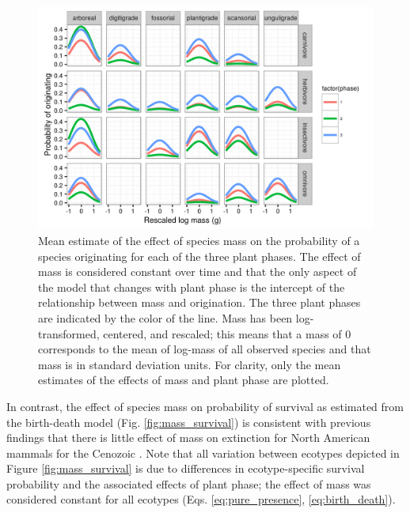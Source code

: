 \begin{figure}[ht]
  \centering
  \includegraphics[width=\textwidth,height=0.4\textheight,keepaspectratio=true]{chapter_coping/figure/mass_on_origin_bd}
  \caption[Effect of mass on probability of species origination as estimated from the birth-death model]{Mean estimate of the effect of species mass on the probability of a species originating for each of the three plant phases. The effect of mass is considered constant over time and that the only aspect of the model that changes with plant phase is the intercept of the relationship between mass and origination. The three plant phases are indicated by the color of the line. Mass has been log-transformed, centered, and rescaled; this means that a mass of 0 corresponds to the mean of log-mass of all observed species and that mass is in standard deviation units. For clarity, only the mean estimates of the effects of mass and plant phase are plotted.}
  \label{fig:mass_origin}
\end{figure}

In contrast, the effect of species mass on probability of survival as estimated from the birth-death model (Fig. \ref{fig:mass_survival}) is consistent with previous findings that there is little effect of mass on extinction for North American mammals for the Cenozoic \citep{Smits2015b,Tomiya2013}. Note that all variation between ecotypes depicted in Figure \ref{fig:mass_survival} is due to differences in ecotype-specific survival probability and the associated effects of plant phase; the effect of mass was considered constant for all ecotypes (Eqs. \ref{eq:pure_presence}, \ref{eq:birth_death}).

